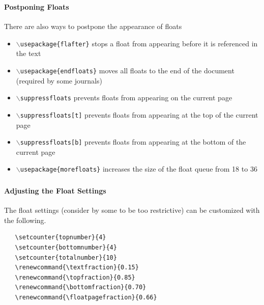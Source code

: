 \documentclass[article]{beamer}
\begin{document}
\begin{frame}
  \frametitle{\thesubsection}
  \framesubtitle{Postponing Floats}
  There are also ways to postpone the appearance of floats
  \begin{itemize}%
    \item \texttt{$\backslash$usepackage\{flafter\}} stops a float from
      appearing before it is referenced in the text
    \item \texttt{$\backslash$usepackage\{endfloats\}} moves all floats to
      the end of the document (required by some journals)
    \item \texttt{$\backslash$suppressfloats} prevents floats from
      appearing on the current page
    \item \texttt{$\backslash$suppressfloats[t]} prevents floats from
      appearing at the top of the current page
    \item \texttt{$\backslash$suppressfloats[b]} prevents floats from
      appearing at the bottom of the current page
    \item \texttt{$\backslash$usepackage\{morefloats\}} increases the size of
      the float queue from 18 to 36
  \end{itemize}
\end{frame}

\begin{frame}[fragile]
  \frametitle{\thesubsection}
  \framesubtitle{Adjusting the Float Settings}
  The float settings (consider by some to be too restrictive) can be
  customized with the following.
   \begin{verbatim}
   \setcounter{topnumber}{4} 
   \setcounter{bottomnumber}{4} 
   \setcounter{totalnumber}{10}
   \renewcommand{\textfraction}{0.15}
   \renewcommand{\topfraction}{0.85}
   \renewcommand{\bottomfraction}{0.70}
   \renewcommand{\floatpagefraction}{0.66}
   \end{verbatim}
\end{frame}
\end{document}
